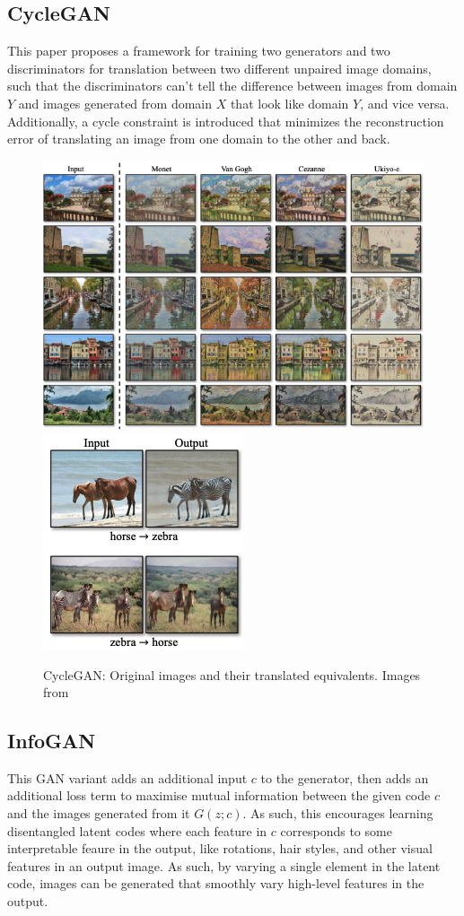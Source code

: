 \subsection{CycleGAN}
This paper \cite{zhu2017unpaired} proposes a framework for training two generators and two discriminators for translation between two different unpaired image domains, such that the discriminators can't tell the difference between images from domain $Y$ and images generated from domain $X$ that look like domain $Y$, and vice versa. Additionally, a cycle constraint is introduced that minimizes the reconstruction error of translating an image from one domain to the other and back.
\begin{figure}[h]
\centering
  \includegraphics[scale=0.25]{chapter_14/files/cyclegan_art.png}
  \includegraphics[scale=0.5]{chapter_14/files/cyclegan_horse.png}
  \caption{CycleGAN: Original images and their translated equivalents. Images from \cite{zhu2017unpaired}}
\end{figure}

\subsection{InfoGAN}
This GAN variant \cite{chen2016infogan} adds an additional input $c$ to the generator, then adds an additional loss term to maximise mutual information between the given code $c$ and the images generated from it $G(z;c)$. As such, this encourages learning disentangled latent codes where each feature in $c$ corresponds to some interpretable feaure in the output, like rotations, hair styles, and other visual features in an output image. As such, by varying a single element in the latent code, images can be generated that smoothly vary high-level features in the output.

